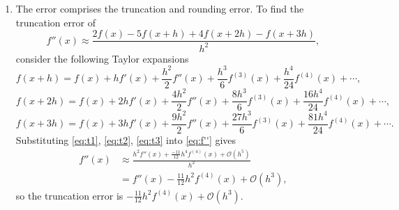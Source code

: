 \documentclass[a4paper,11pt]{article}
\begin{document}
\begin{enumerate}
\begin{enumerate}
		\item The error comprises the truncation and rounding error. To 
		find the truncation error of 
		\begin{equation}
			f''(x) \approx \frac{2f(x)-5f(x+h)+4f(x+2h)-f(x+3h)}{h^{2}},
			\label{eq:f''}
		\end{equation}
		consider the following Taylor expansions
		\begin{equation}
			f(x + h) = f(x) + hf'(x) + \frac{h^{2}}{2}f''(x) + 
			\frac{h^{3}}{6}f^{(3)}(x) + \frac{h^{4}}{24}f^{(4)}(x) + \cdots,
			\label{eq:t1}
		\end{equation}
		\begin{equation}
			f(x + 2h) = f(x) + 2hf'(x) + \frac{4h^{2}}{2}f''(x) + 
			\frac{8h^{3}}{6}f^{(3)}(x) + \frac{16h^{4}}{24}f^{(4)}(x) + 
			\cdots,
			\label{eq:t2}
		\end{equation}
		\begin{equation}
			f(x + 3h) = f(x) + 3hf'(x) + \frac{9h^{2}}{2}f''(x) + 
			\frac{27h^{3}}{6}f^{(3)}(x) + \frac{81h^{4}}{24}f^{(4)}(x) + 
			\cdots.
			\label{eq:t3}
		\end{equation}
		Substituting \eqref{eq:t1}, \eqref{eq:t2}, \eqref{eq:t3} into 
		\eqref{eq:f''} gives
		\begin{align}
			f''(x) &\approx \frac{h^{2}f''(x) + 
			\frac{-11}{12}h^{4}f^{(4)}(x) + \mathcal{O}(h^{5})}{h^{2}}\\
			&= f''(x) - \frac{11}{12}h^{2}f^{(4)}(x) + 
			\mathcal{O}(h^{3}),
		\end{align}
		so the truncation error is $-\frac{11}{12}h^{2}f^{(4)}(x) + 
		\mathcal{O}(h^{3})$.
		

\end{enumerate}
\end{enumerate}
\end{document}
